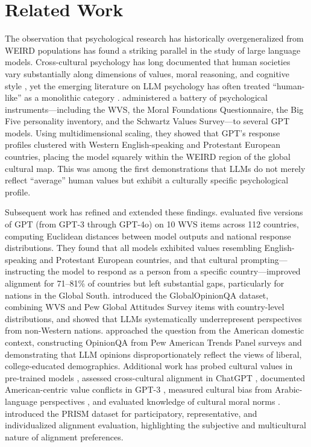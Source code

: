 \documentclass{article}
\begin{document}
\section{Related Work}

The observation that psychological research has historically overgeneralized from WEIRD populations \citep{henrich2010weirdest} has found a striking parallel in the study of large language models. Cross-cultural psychology has long documented that human societies vary substantially along dimensions of values, moral reasoning, and cognitive style \citep{hofstede2001culture, schwartz2012overview, inglehart2000modernization}, yet the emerging literature on LLM psychology has often treated ``human-like'' as a monolithic category \citep{buttrick2024studying}. \citet{atari2023which} administered a battery of psychological instruments---including the WVS, the Moral Foundations Questionnaire, the Big Five personality inventory, and the Schwartz Values Survey---to several GPT models. Using multidimensional scaling, they showed that GPT's response profiles clustered with Western English-speaking and Protestant European countries, placing the model squarely within the WEIRD region of the global cultural map. This was among the first demonstrations that LLMs do not merely reflect ``average'' human values but exhibit a culturally specific psychological profile.

Subsequent work has refined and extended these findings. \citet{tao2024cultural} evaluated five versions of GPT (from GPT-3 through GPT-4o) on 10 WVS items across 112 countries, computing Euclidean distances between model outputs and national response distributions. They found that all models exhibited values resembling English-speaking and Protestant European countries, and that cultural prompting---instructing the model to respond as a person from a specific country---improved alignment for 71--81\% of countries but left substantial gaps, particularly for nations in the Global South. \citet{durmus2023measuring} introduced the GlobalOpinionQA dataset, combining WVS and Pew Global Attitudes Survey items with country-level distributions, and showed that LLMs systematically underrepresent perspectives from non-Western nations. \citet{santurkar2023whose} approached the question from the American domestic context, constructing OpinionQA from Pew American Trends Panel surveys and demonstrating that LLM opinions disproportionately reflect the views of liberal, college-educated demographics. Additional work has probed cultural values in pre-trained models \citep{arora2023probing}, assessed cross-cultural alignment in ChatGPT \citep{cao2023assessing}, documented American-centric value conflicts in GPT-3 \citep{johnson2022ghost}, measured cultural bias from Arabic-language perspectives \citep{naous2024having}, and evaluated knowledge of cultural moral norms \citep{ramezani2023knowledge}. \citet{kirk2024prism} introduced the PRISM dataset for participatory, representative, and individualized alignment evaluation, highlighting the subjective and multicultural nature of alignment preferences.
\end{document}
